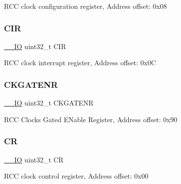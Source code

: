 R\+CC clock configuration register, Address offset\+: 0x08 \mbox{\label{struct_r_c_c___type_def_a907d8154c80b7e385478943f90b17a3b}} 
\subsubsection{\texorpdfstring{C\+IR}{CIR}}
{\footnotesize\ttfamily \mbox{\hyperlink{core__sc300_8h_aec43007d9998a0a0e01faede4133d6be}{\+\_\+\+\_\+\+IO}} uint32\+\_\+t C\+IR}

R\+CC clock interrupt register, Address offset\+: 0x0C \mbox{\label{struct_r_c_c___type_def_a968181c52f663e22dd22d2622deb2455}} 
\subsubsection{\texorpdfstring{C\+K\+G\+A\+T\+E\+NR}{CKGATENR}}
{\footnotesize\ttfamily \mbox{\hyperlink{core__sc300_8h_aec43007d9998a0a0e01faede4133d6be}{\+\_\+\+\_\+\+IO}} uint32\+\_\+t C\+K\+G\+A\+T\+E\+NR}

R\+CC Clocks Gated E\+Nable Register, Address offset\+: 0x90 \mbox{\label{struct_r_c_c___type_def_ab40c89c59391aaa9d9a8ec011dd0907a}} 
\subsubsection{\texorpdfstring{CR}{CR}}
{\footnotesize\ttfamily \mbox{\hyperlink{core__sc300_8h_aec43007d9998a0a0e01faede4133d6be}{\+\_\+\+\_\+\+IO}} uint32\+\_\+t CR}

R\+CC clock control register, Address offset\+: 0x00 \mbox{\label{struct_r_c_c___type_def_a876dd0a8546697065f406b7543e27af2}} 
